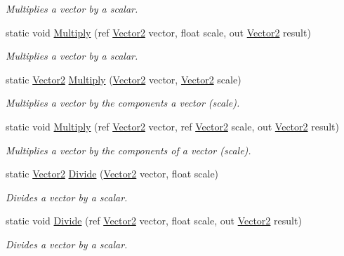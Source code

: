 \begin{DoxyCompactItemize}
\begin{DoxyCompactList}\small\item\em Multiplies a vector by a scalar. \end{DoxyCompactList}\item 
static void \hyperlink{struct_open_t_k_1_1_vector2_aaa1eae8f68d9c1dc18d2f0774baf0cde}{Multiply} (ref \hyperlink{struct_open_t_k_1_1_vector2}{Vector2} vector, float scale, out \hyperlink{struct_open_t_k_1_1_vector2}{Vector2} result)
\begin{DoxyCompactList}\small\item\em Multiplies a vector by a scalar. \end{DoxyCompactList}\item 
static \hyperlink{struct_open_t_k_1_1_vector2}{Vector2} \hyperlink{struct_open_t_k_1_1_vector2_a9a03b45fe5032bcf2cd956616d6dbf78}{Multiply} (\hyperlink{struct_open_t_k_1_1_vector2}{Vector2} vector, \hyperlink{struct_open_t_k_1_1_vector2}{Vector2} scale)
\begin{DoxyCompactList}\small\item\em Multiplies a vector by the components a vector (scale). \end{DoxyCompactList}\item 
static void \hyperlink{struct_open_t_k_1_1_vector2_af5ca9af5ebda779cf389d0912326e1c7}{Multiply} (ref \hyperlink{struct_open_t_k_1_1_vector2}{Vector2} vector, ref \hyperlink{struct_open_t_k_1_1_vector2}{Vector2} scale, out \hyperlink{struct_open_t_k_1_1_vector2}{Vector2} result)
\begin{DoxyCompactList}\small\item\em Multiplies a vector by the components of a vector (scale). \end{DoxyCompactList}\item 
static \hyperlink{struct_open_t_k_1_1_vector2}{Vector2} \hyperlink{struct_open_t_k_1_1_vector2_a1758508ecc9e496612c4ff7b2ff2c549}{Divide} (\hyperlink{struct_open_t_k_1_1_vector2}{Vector2} vector, float scale)
\begin{DoxyCompactList}\small\item\em Divides a vector by a scalar. \end{DoxyCompactList}\item 
static void \hyperlink{struct_open_t_k_1_1_vector2_a2e8c56f3ec21a4a8aac59f32e9ef21a9}{Divide} (ref \hyperlink{struct_open_t_k_1_1_vector2}{Vector2} vector, float scale, out \hyperlink{struct_open_t_k_1_1_vector2}{Vector2} result)
\begin{DoxyCompactList}\small\item\em Divides a vector by a scalar. \end{DoxyCompactList}\item 

\end{DoxyCompactItemize}

